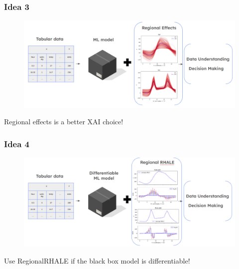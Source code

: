 \documentclass{beamer}
\begin{document}
\begin{frame}
  \frametitle{Idea 3}
  \begin{figure}[ht]
    \centering
    \includegraphics[width=\textwidth]{./figures/convincing_point_3.png}
  \end{figure}
  \noindent\makebox[\linewidth]{\rule{\paperwidth}{0.4pt}}
  Regional effects is a better XAI choice!
\end{frame}

\begin{frame}
  \frametitle{Idea 4}
  \begin{figure}[ht]
    \centering
    \includegraphics[width=\textwidth]{./figures/convincing_point_4.png}
  \end{figure}
  \noindent\makebox[\linewidth]{\rule{\paperwidth}{0.4pt}}
  Use RegionalRHALE if the black box model is differentiable!
\end{frame}

\end{document}
